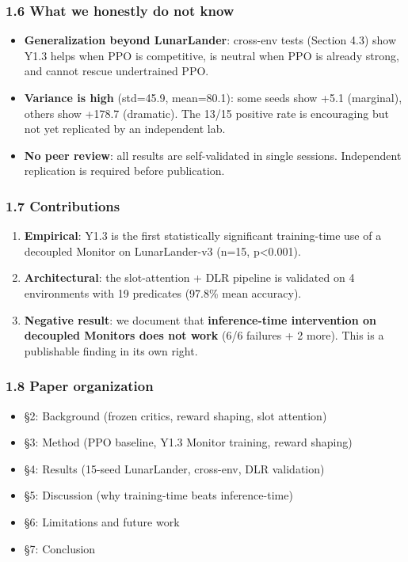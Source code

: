 \documentclass[
]{article}
\providecommand{\tightlist}{%
  \setlength{\itemsep}{0pt}\setlength{\parskip}{0pt}}
\begin{document}
\subsubsection{1.6 What we honestly do not
know}\label{what-we-honestly-do-not-know}

\begin{itemize}
\tightlist
\item
  \textbf{Generalization beyond LunarLander}: cross-env tests (Section
  4.3) show Y1.3 helps when PPO is competitive, is neutral when PPO is
  already strong, and cannot rescue undertrained PPO.
\item
  \textbf{Variance is high} (std=45.9, mean=80.1): some seeds show +5.1
  (marginal), others show +178.7 (dramatic). The 13/15 positive rate is
  encouraging but not yet replicated by an independent lab.
\item
  \textbf{No peer review}: all results are self-validated in single
  sessions. Independent replication is required before publication.
\end{itemize}

\subsubsection{1.7 Contributions}\label{contributions}

\begin{enumerate}
\def\labelenumi{\arabic{enumi}.}
\tightlist
\item
  \textbf{Empirical}: Y1.3 is the first statistically significant
  training-time use of a decoupled Monitor on LunarLander-v3 (n=15,
  p\textless0.001).
\item
  \textbf{Architectural}: the slot-attention + DLR pipeline is validated
  on 4 environments with 19 predicates (97.8\% mean accuracy).
\item
  \textbf{Negative result}: we document that \textbf{inference-time
  intervention on decoupled Monitors does not work} (6/6 failures + 2
  more). This is a publishable finding in its own right.
\end{enumerate}

\subsubsection{1.8 Paper organization}\label{paper-organization}

\begin{itemize}
\tightlist
\item
  §2: Background (frozen critics, reward shaping, slot attention)
\item
  §3: Method (PPO baseline, Y1.3 Monitor training, reward shaping)
\item
  §4: Results (15-seed LunarLander, cross-env, DLR validation)
\item
  §5: Discussion (why training-time beats inference-time)
\item
  §6: Limitations and future work
\item
  §7: Conclusion
\end{itemize}
\end{document}
